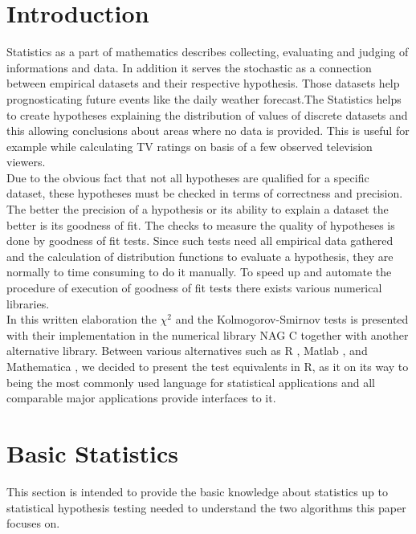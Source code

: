 \documentclass{article}
\theoremstyle{definition}
\begin{document}
\section{Introduction}
Statistics as a part of mathematics describes collecting, evaluating and judging of informations and data. In addition it serves the stochastic as a connection between empirical datasets and their respective hypothesis. Those datasets help prognosticating future events like the daily weather forecast.The Statistics helps to create hypotheses explaining the distribution of values of discrete datasets and this allowing conclusions about areas where no data is provided. This is useful for example while calculating TV ratings on basis of a few observed television viewers.\\
Due to the obvious fact that not all hypotheses are qualified for a specific dataset, these hypotheses must be checked in terms of correctness and precision.
The better the precision of a hypothesis or its ability to explain a dataset the better is its goodness of fit.
The checks to measure the quality of hypotheses is done by goodness of fit tests. Since such tests need all empirical data gathered and the calculation of distribution functions to evaluate a hypothesis, they are normally to time consuming to do it manually. To speed up and automate the procedure of execution of goodness of fit tests there exists various numerical libraries.\\ 
In this written elaboration the $\chi^2$ and the Kolmogorov-Smirnov tests is presented with their implementation in the numerical library NAG C together with another alternative library. Between various alternatives such as R \cite{hellbrueck2009angewandte}, Matlab \cite{benker2001statistik}, and Mathematica \cite{jaeger1997statistik}, we decided to present the test equivalents in R, as it on its way to being the most commonly used language for statistical applications and all comparable major applications provide interfaces to it.
\section{Basic Statistics}
This section is intended to provide the basic knowledge about statistics up to statistical hypothesis testing needed to understand the two algorithms this paper focuses on.
\end{document}
